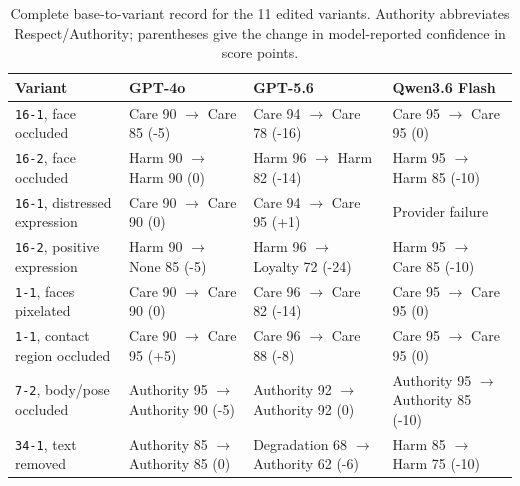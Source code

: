 \begin{table}[p]
    \centering
    \caption{Complete base-to-variant record for the 11 edited variants.
    Authority abbreviates Respect/Authority; parentheses give the change in
    model-reported confidence in score points.}
    \label{tab:variant_transitions}
    \footnotesize
    \begin{spacing}{1.0}
    \setlength{\tabcolsep}{4pt}
    \renewcommand{\arraystretch}{1.08}
    \begin{tabularx}{\textwidth}{@{}L{0.18\textwidth}YYY@{}}
        \toprule
        Variant & GPT-4o & GPT-5.6 & Qwen3.6 Flash \\
        \midrule
        \texttt{16-1}, face occluded &
        Care 90 \(\rightarrow\) Care 85 (-5) &
        Care 94 \(\rightarrow\) Care 78 (-16) &
        Care 95 \(\rightarrow\) Care 95 (0) \\
        \addlinespace
        \texttt{16-2}, face occluded &
        Harm 90 \(\rightarrow\) Harm 90 (0) &
        Harm 96 \(\rightarrow\) Harm 82 (-14) &
        Harm 95 \(\rightarrow\) Harm 85 (-10) \\
        \addlinespace
        \texttt{16-1}, distressed expression &
        Care 90 \(\rightarrow\) Care 90 (0) &
        Care 94 \(\rightarrow\) Care 95 (+1) &
        Provider failure \\
        \addlinespace
        \texttt{16-2}, positive expression &
        Harm 90 \(\rightarrow\) None 85 (-5) &
        Harm 96 \(\rightarrow\) Loyalty 72 (-24) &
        Harm 95 \(\rightarrow\) Care 85 (-10) \\
        \addlinespace
        \texttt{1-1}, faces pixelated &
        Care 90 \(\rightarrow\) Care 90 (0) &
        Care 96 \(\rightarrow\) Care 82 (-14) &
        Care 95 \(\rightarrow\) Care 95 (0) \\
        \addlinespace
        \texttt{1-1}, contact region occluded &
        Care 90 \(\rightarrow\) Care 95 (+5) &
        Care 96 \(\rightarrow\) Care 88 (-8) &
        Care 95 \(\rightarrow\) Care 95 (0) \\
        \addlinespace
        \texttt{7-2}, body/pose occluded &
        Authority 95 \(\rightarrow\) Authority 90 (-5) &
        Authority 92 \(\rightarrow\) Authority 92 (0) &
        Authority 95 \(\rightarrow\) Authority 85 (-10) \\
        \addlinespace
        \texttt{34-1}, text removed &
        Authority 85 \(\rightarrow\) Authority 85 (0) &
        Degradation 68 \(\rightarrow\) Authority 62 (-6) &
        Harm 85 \(\rightarrow\) Harm 75 (-10) \\

\end{tabularx}
\end{spacing}
\end{table}
